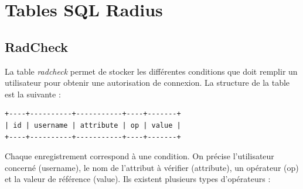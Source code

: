 \section{Tables SQL Radius}

\subsection{RadCheck}

La table \textit{radcheck} permet de stocker les différentes conditions que doit remplir un utilisateur pour obtenir une autorisation de connexion. La structure de la table est la suivante :

\begin{verbatim}
+----+----------+-----------+----+-------+
| id | username | attribute | op | value |
+----+----------+-----------+----+-------+
\end{verbatim}

Chaque enregistrement correspond à une condition. On précise l'utilisateur concerné (username), le nom de l'attribut à vérifier (attribute), un opérateur (op) et la valeur de référence (value). Ils existent plusieurs types d'opérateurs :


